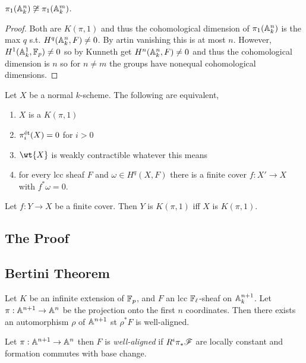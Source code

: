 \documentclass[12pt]{article}
\begin{document}
\begin{cor}
$\pi_1(\mathbb{A}^n_k) \not\cong \pi_1(\mathbb{A}^m_k)$.
\end{cor}

\begin{proof}
Both are $K(\pi, 1)$ and thus the cohomological dimension of $\pi_1(\mathbb{A}^n_k)$ is the max $q$ s.t. $H^q(\mathbb{A}^n_k, F) \neq 0$. By artin vanishing this is at most $n$. However, $H^1(\mathbb{A}^1_k, \mathbb{F}_p) \neq 0$ so by Kunneth get $H^n(\mathbb{A}^n_k, F) \neq 0$ and thus the cohomological dimension is $n$ so for $n \neq m$ the groups have nonequal cohomological dimensions.
\end{proof}


\begin{prop}
Let $X$ be a normal $k$-scheme. The following are equivalent,
\begin{enumerate}
\item $X$ is a $K(\pi, 1)$
\item $\pi^{\text{\'{e}t}}_i(X) = 0$ for $i > 0$
\item $\wt{X}$ is weakly contractible whatever this means
\item for every lcc sheaf $F$ and $\omega \in H^q(X, F)$ there is a finite \etale cover $f : X' \to X$ with $f^* \omega = 0$.
\end{enumerate}
\end{prop}

\begin{prop}
Let $f : Y \to X$ be a finite \etale cover. Then $Y$ is $K(\pi, 1)$ iff $X$ is $K(\pi, 1)$.
\end{prop}

\subsection{The Proof}

\subsection{Bertini Theorem}

\begin{prop}
Let $K$ be an infinite extension of $\mathbb{F}_p$, and $F$ an lcc $\mathbb{F}_\ell$-sheaf on $\mathbb{A}_k^{n+1}$. Let $\pi : \mathbb{A}^{n+1} \to \mathbb{A}^n$ be the projection onto the first $n$ coordinates. Then there exists an automorphism $\rho$ of $\mathbb{A}^{n+1}$ st $\rho^* F$ is well-aligned.
\end{prop}

\begin{defn}
Let $\pi : \mathbb{A}^{n+1} \to \mathbb{A}^n$ then $F$ is \textit{well-aligned} if $R^i \pi_* \mathscr{F}$ are locally constant and formation commutes with base change.
\end{defn}
\end{document}
